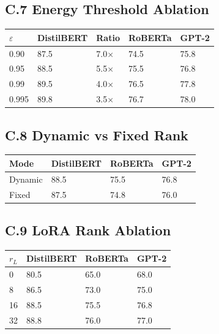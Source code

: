 \subsection{C.7 Energy Threshold Ablation}

\begin{table}[H]
\centering
\small
\begin{tabular}{lllll}
\toprule
\textbf{$\varepsilon$} & \textbf{DistilBERT} & \textbf{Ratio} & \textbf{RoBERTa} & \textbf{GPT-2} \\
\midrule
0.90 & 87.5 & 7.0$\times$ & 74.5 & 75.8 \\
0.95 & 88.5 & 5.5$\times$ & 75.5 & 76.8 \\
0.99 & 89.5 & 4.0$\times$ & 76.5 & 77.8 \\
0.995 & 89.8 & 3.5$\times$ & 76.7 & 78.0 \\
\bottomrule
\end{tabular}
\end{table}

\subsection{C.8 Dynamic vs Fixed Rank}

\begin{table}[H]
\centering
\small
\begin{tabular}{llll}
\toprule
\textbf{Mode} & \textbf{DistilBERT} & \textbf{RoBERTa} & \textbf{GPT-2} \\
\midrule
Dynamic & 88.5 & 75.5 & 76.8 \\
Fixed & 87.5 & 74.8 & 76.0 \\
\bottomrule
\end{tabular}
\end{table}

\subsection{C.9 LoRA Rank Ablation}

\begin{table}[H]
\centering
\small
\begin{tabular}{llll}
\toprule
\textbf{$r_L$} & \textbf{DistilBERT} & \textbf{RoBERTa} & \textbf{GPT-2} \\
\midrule
0 & 80.5 & 65.0 & 68.0 \\
8 & 86.5 & 73.0 & 75.0 \\
16 & 88.5 & 75.5 & 76.8 \\
32 & 88.8 & 76.0 & 77.0 \\
\bottomrule
\end{tabular}
\end{table}

